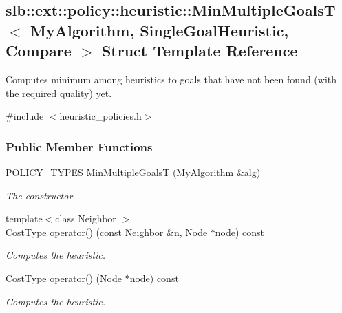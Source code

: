 \hypertarget{structslb_1_1ext_1_1policy_1_1heuristic_1_1MinMultipleGoalsT}{}\subsection{slb\+:\+:ext\+:\+:policy\+:\+:heuristic\+:\+:Min\+Multiple\+GoalsT$<$ My\+Algorithm, Single\+Goal\+Heuristic, Compare $>$ Struct Template Reference}
\label{structslb_1_1ext_1_1policy_1_1heuristic_1_1MinMultipleGoalsT}


Computes minimum among heuristics to goals that have not been found (with the required quality) yet.  




{\ttfamily \#include $<$heuristic\+\_\+policies.\+h$>$}

\subsubsection*{Public Member Functions}
\begin{DoxyCompactItemize}
\item 
\hyperlink{extensions_2shared__policies_2headers_8h_ae70a06fa4631780beea14971eb36a562}{P\+O\+L\+I\+C\+Y\+\_\+\+T\+Y\+P\+ES} \hyperlink{structslb_1_1ext_1_1policy_1_1heuristic_1_1MinMultipleGoalsT_a5234686dc140005dd9c6f6d5524b0ee8}{Min\+Multiple\+GoalsT} (My\+Algorithm \&alg)
\begin{DoxyCompactList}\small\item\em The constructor. \end{DoxyCompactList}\item 
{\footnotesize template$<$class Neighbor $>$ }\\Cost\+Type \hyperlink{structslb_1_1ext_1_1policy_1_1heuristic_1_1MinMultipleGoalsT_a3651719ae7081b0aa624c41ea3a89976}{operator()} (const Neighbor \&n, Node $\ast$node) const 
\begin{DoxyCompactList}\small\item\em Computes the heuristic. \end{DoxyCompactList}\item 
Cost\+Type \hyperlink{structslb_1_1ext_1_1policy_1_1heuristic_1_1MinMultipleGoalsT_a7ebd8a9bc6ff1bf7a3ab695635892d7e}{operator()} (Node $\ast$node) const 
\begin{DoxyCompactList}\small\item\em Computes the heuristic. \end{DoxyCompactList}\end{DoxyCompactItemize}
